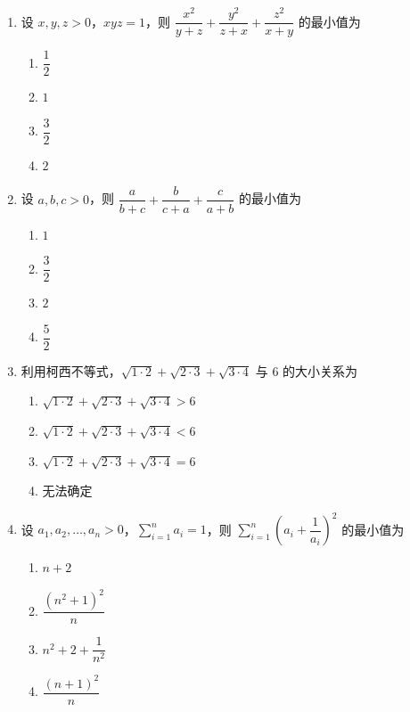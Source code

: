 \documentclass[12pt, a4paper]{ctexart}
\newcommand{\score}[1]{\hfill\makebox[2cm][l]{(#1分)}}
\begin{document}
\begin{enumerate}
\item 设 $x, y, z > 0$，$xyz = 1$，则 $\dfrac{x^2}{y+z} + \dfrac{y^2}{z+x} + \dfrac{z^2}{x+y}$ 的最小值为\score{5}
\begin{enumerate}[label=\Alph*.]
\item $\dfrac{1}{2}$
\item $1$
\item $\dfrac{3}{2}$
\item $2$
\end{enumerate}

\item 设 $a, b, c > 0$，则 $\dfrac{a}{b+c} + \dfrac{b}{c+a} + \dfrac{c}{a+b}$ 的最小值为\score{5}
\begin{enumerate}[label=\Alph*.]
\item $1$
\item $\dfrac{3}{2}$
\item $2$
\item $\dfrac{5}{2}$
\end{enumerate}

\item 利用柯西不等式，$\sqrt{1 \cdot 2} + \sqrt{2 \cdot 3} + \sqrt{3 \cdot 4}$ 与 $6$ 的大小关系为\score{5}
\begin{enumerate}[label=\Alph*.]
\item $\sqrt{1 \cdot 2} + \sqrt{2 \cdot 3} + \sqrt{3 \cdot 4} > 6$
\item $\sqrt{1 \cdot 2} + \sqrt{2 \cdot 3} + \sqrt{3 \cdot 4} < 6$
\item $\sqrt{1 \cdot 2} + \sqrt{2 \cdot 3} + \sqrt{3 \cdot 4} = 6$
\item 无法确定
\end{enumerate}

\item 设 $a_1, a_2, \ldots, a_n > 0$，$\displaystyle\sum_{i=1}^{n} a_i = 1$，则 $\displaystyle\sum_{i=1}^{n} \left(a_i + \dfrac{1}{a_i}\right)^2$ 的最小值为\score{5}
\begin{enumerate}[label=\Alph*.]
\item $n + 2$
\item $\dfrac{(n^2 + 1)^2}{n}$
\item $n^2 + 2 + \dfrac{1}{n^2}$
\item $\dfrac{(n+1)^2}{n}$
\end{enumerate}

\end{enumerate}

\vspace{0.5cm}
\end{document}
